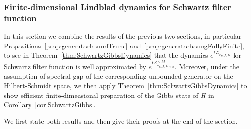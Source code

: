 \documentclass[11pt]{amsart}
\newcommand{\1}{\mathbbm{1}}
\newcommand{\cL}{\mathcal{L}}
\theoremstyle{plain}
\theoremstyle{definition}
\theoremstyle{remark}
\numberwithin{equation}{section}
\begin{document}
\subsubsection{Finite-dimensional Lindblad dynamics for Schwartz filter function}
\label{sec:FiniteDimPreperationSchwartz}

In this section we combine the results of the previous two sections, in particular Propositions~\ref{prop:generatorboundTrunc} and~\ref{prop:generatorboungFullyFinite}, to see in Theorem~\ref{thm:SchwartzGibbsDynamics} that the dynamics $e^{t\cL_{\sigma_E,\widehat f,H}}$ for Schwartz filter function is well approximated by $e^{t\cL^{\le M}_{\sigma_E,\widehat f,H_{\le M}}}.$ 
Moreover,  under the assumption of spectral gap of the corresponding unbounded generator on the Hilbert-Schmidt space,  we then apply Theorem~\ref{thm:SchwartzGibbsDynamics} to show efficient finite-dimensional preparation of the Gibbs state of $H$ in Corollary~\ref{cor:SchwartzGibbs}. 

We first state both results and then give their proofs at the end of the section.
\end{document}
